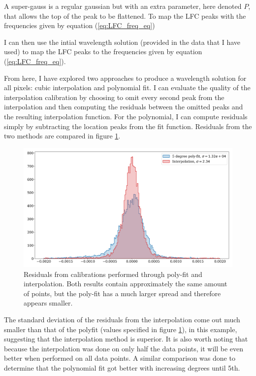     A super-gauss is a regular gaussian but with an extra parameter, here denoted $P$, that allows the top of the peak to be flattened. To map the LFC peaks with the frequencies given by equation (\ref{eq:LFC_freq_eq})

    I can then use the intial wavelength solution (provided in the data that I have used) to map the LFC peaks to the frequencies given by equation (\ref{eq:LFC_freq_eq}). 

    From here, I have explored two approaches to produce a wavelength solution for all pixels: cubic interpolation and polynomial fit. I can evaluate the quality of the interpolation calibration by choosing to omit every second peak from the interpolation and then computing the residuals between the omitted peaks and the resulting interpolation function. For the polynomial, I can compute residuals simply by subtracting the location peaks from the fit function. Residuals from the two methods are compared in figure \ref{fig:calib_poly_vs_interp}.

    \begin{figure}[ht]
        \centering
        \includegraphics[scale=0.40]{figures/hist_peak_residuals_poly_and_interp3.png}
        \caption{Residuals from calibrations performed through poly-fit and interpolation. Both results contain approximately the same amount of points, but the poly-fit has a much larger spread and therefore appears smaller.  }
        \label{fig:calib_poly_vs_interp}
    \end{figure}

    The standard deviation of the residuals from the interpolation come out much smaller than that of the polyfit (values specified in figure \ref{fig:calib_poly_vs_interp}), in this example, suggesting that the interpolation method is superior. It is also worth noting that because the interpolation was done on only half the data points, it will be even better when performed on all data points. A similar comparison was done to determine that the polynomial fit got better with increasing degrees until 5th. 

